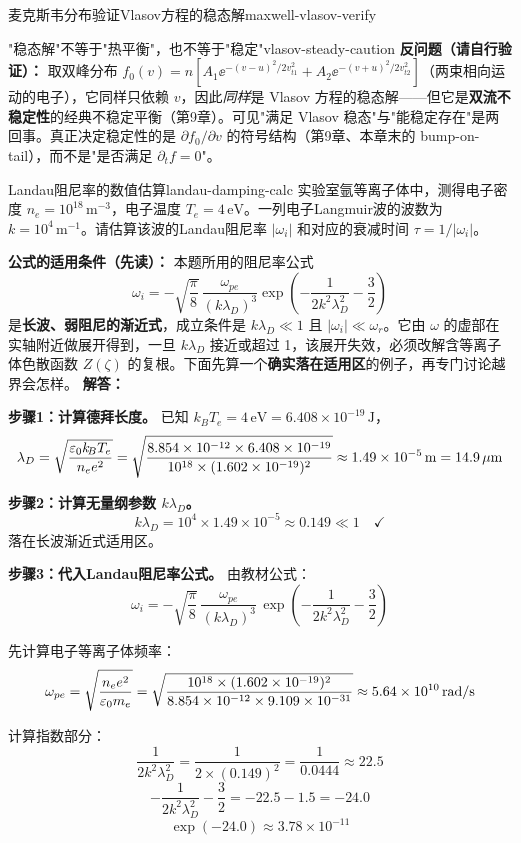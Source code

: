\begin{example}{麦克斯韦分布验证Vlasov方程的稳态解}{maxwell-vlasov-verify}
\begin{warning}{"稳态解"不等于"热平衡"，也不等于"稳定"}{vlasov-steady-caution}
\textbf{反问题（请自行验证）：} 取双峰分布 $f_0(v)=n[A_1\ee^{-(v-u)^2/2v_{t1}^2}+A_2\ee^{-(v+u)^2/2v_{t2}^2}]$（两束相向运动的电子），它同样只依赖 $v$，因此\emph{同样}是 Vlasov 方程的稳态解——但它是\textbf{双流不稳定性}的经典不稳定平衡（第9章）。可见"满足 Vlasov 稳态"与"能稳定存在"是两回事。真正决定稳定性的是 $\partial f_0/\partial v$ 的符号结构（第9章、本章末的 bump-on-tail），而不是"是否满足 $\partial_tf=0$"。
\end{warning}
\end{example}

\begin{example}{Landau阻尼率的数值估算}{landau-damping-calc}
实验室氩等离子体中，测得电子密度 $n_e = 10^{18}\,\mathrm{m}^{-3}$，电子温度 $T_e = 4\,\mathrm{eV}$。一列电子Langmuir波的波数为 $k = 10^{4}\,\mathrm{m}^{-1}$。请估算该波的Landau阻尼率 $|\omega_i|$ 和对应的衰减时间 $\tau = 1/|\omega_i|$。

\textbf{公式的适用条件（先读）：} 本题所用的阻尼率公式
\[
\omega_i = -\sqrt{\frac{\pi}{8}}\,\frac{\omega_{pe}}{(k\lambda_D)^3}\exp\!\left(-\frac{1}{2k^2\lambda_D^2} - \frac{3}{2}\right)
\]
是\textbf{长波、弱阻尼的渐近式}，成立条件是 $k\lambda_D\ll1$ 且 $|\omega_i|\ll\omega_r$。它由 $\omega$ 的虚部在实轴附近做展开得到，一旦 $k\lambda_D$ 接近或超过 1，该展开失效，必须改解含等离子体色散函数 $Z(\zeta)$ 的复根。下面先算一个\textbf{确实落在适用区}的例子，再专门讨论越界会怎样。
\tcblower
\textbf{解答：}

\textbf{步骤1：计算德拜长度。}
已知 $k_{\!B}T_e = 4\,\mathrm{eV} = 6.408\times 10^{-19}\,\mathrm{J}$，
\[
\lambda_D = \sqrt{\frac{\varepsilon_0 k_{\!B}T_e}{n_e e^2}}
= \sqrt{\frac{8.854\times 10^{-12}\times 6.408\times 10^{-19}}{10^{18}\times (1.602\times 10^{-19})^2}}
\approx 1.49\times 10^{-5}\,\mathrm{m} = 14.9\,\mu\mathrm{m}
\]

\textbf{步骤2：计算无量纲参数 $k\lambda_D$。}
\[
k\lambda_D = 10^{4}\times 1.49\times 10^{-5} \approx 0.149 \ll 1 \quad\checkmark
\]
落在长波渐近式适用区。

\textbf{步骤3：代入Landau阻尼率公式。}
由教材公式：
\[
\omega_i = -\sqrt{\frac{\pi}{8}}\,\frac{\omega_{pe}}{(k\lambda_D)^3}\,
\exp\!\left(-\frac{1}{2k^2\lambda_D^2} - \frac{3}{2}\right)
\]

先计算电子等离子体频率：
\[
\omega_{pe} = \sqrt{\frac{n_e e^2}{\varepsilon_0 m_e}}
= \sqrt{\frac{10^{18}\times (1.602\times 10^{-19})^2}{8.854\times 10^{-12}\times 9.109\times 10^{-31}}}
\approx 5.64\times 10^{10}\,\mathrm{rad/s}
\]

计算指数部分：
\[
\frac{1}{2k^2\lambda_D^2} = \frac{1}{2\times (0.149)^2} = \frac{1}{0.0444} \approx 22.5
\]
\[
-\frac{1}{2k^2\lambda_D^2} - \frac{3}{2} = -22.5 - 1.5 = -24.0
\]
\[
\exp(-24.0) \approx 3.78\times 10^{-11}
\]


\end{example}
